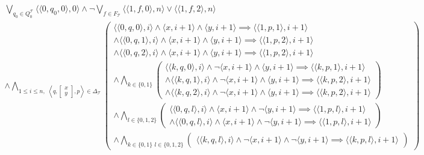 \begin{multline}
    \bigvee_{q_0 \in Q_0^{\mathcal{T}}} \langle \langle 0, q_0, 0 \rangle , 0 \rangle \wedge \lnot \bigvee_{f \in F_{\mathcal{T}}} \langle \langle 1,f,0 \rangle,n \rangle \vee \langle \langle 1,f,2\rangle,n \rangle\\
    \wedge \bigwedge_{1 \leq i \leq n, \,\, \left\langle q, \left[\substack{x \\ y}\right],p \right\rangle \in \Delta_{\mathcal{T}}}
    \begin{pmatrix}
        \langle \langle 0,q,0 \rangle,i \rangle \wedge \langle x, i+1 \rangle \wedge \langle y, i+1 \rangle \implies \langle \langle 1,p,1 \rangle,i+1 \rangle \\
        \wedge \langle \langle 0,q,1 \rangle,i \rangle \wedge \langle x, i+1 \rangle \wedge \langle y, i+1 \rangle \implies \langle \langle 1,p,2 \rangle,i+1 \rangle \\
        \wedge \langle \langle 0,q,2 \rangle,i \rangle \wedge \langle x, i+1 \rangle \wedge \langle y, i+1 \rangle \implies \langle \langle 1,p,2 \rangle,i+1 \rangle \\
        \wedge \bigwedge_{k \in \{0,1\}}
        \begin{pmatrix}
            \langle \langle k,q,0 \rangle,i \rangle \wedge \lnot \langle x, i+1 \rangle \wedge \langle y, i+1 \rangle \implies \langle \langle k,p,1 \rangle,i+1 \rangle \\
        \wedge \langle \langle k,q,1 \rangle,i \rangle \wedge \lnot \langle x, i+1 \rangle \wedge \langle y, i+1 \rangle \implies \langle \langle k,p,2 \rangle,i+1 \rangle \\
        \wedge \langle \langle k,q,2 \rangle,i \rangle \wedge \lnot \langle x, i+1 \rangle \wedge \langle y, i+1 \rangle \implies \langle \langle k,p,2 \rangle,i+1 \rangle
        \end{pmatrix} \\
        \wedge \bigwedge_{l \in \{0,1,2\}}
        \begin{pmatrix}
            \langle \langle 0,q,l \rangle,i \rangle \wedge \langle x, i+1 \rangle \wedge \lnot \langle y, i+1 \rangle \implies \langle \langle 1,p,l \rangle,i+1 \rangle \\
        \wedge \langle \langle 0,q,l \rangle,i \rangle \wedge \langle x, i+1 \rangle \wedge \lnot \langle y, i+1 \rangle \implies \langle \langle 1,p,l \rangle,i+1 \rangle
        \end{pmatrix} \\
        \wedge \bigwedge_{k \in \{0,1\} \,\, l \in \{0,1,2\} }
        \begin{pmatrix}
            \langle \langle k,q,l \rangle,i \rangle \wedge \lnot \langle x, i+1 \rangle \wedge \lnot \langle y, i+1 \rangle \implies \langle \langle k,p,l \rangle,i+1 \rangle
        \end{pmatrix}
    \end{pmatrix}
\end{multline}

